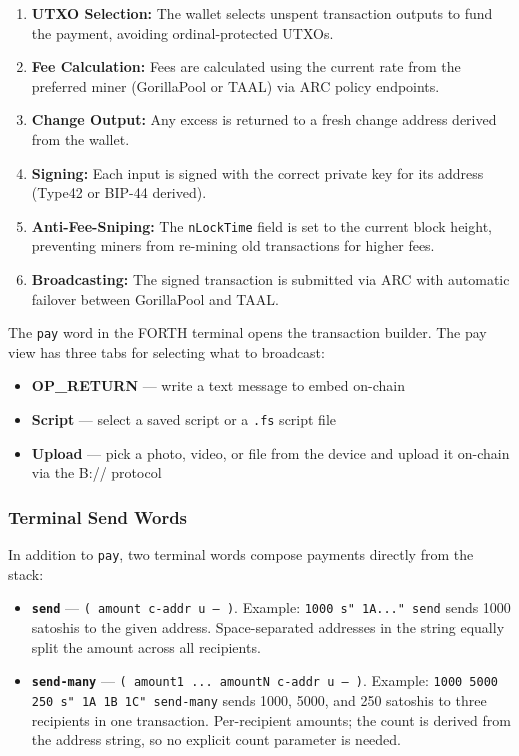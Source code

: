 \documentclass[a4paper, 11pt, openany]{book}
\begin{document}
\begin{enumerate}
\item \textbf{UTXO Selection:} The wallet selects unspent transaction outputs to fund the payment, avoiding ordinal-protected UTXOs.
\item \textbf{Fee Calculation:} Fees are calculated using the current rate from the preferred miner (GorillaPool or TAAL) via ARC policy endpoints.
\item \textbf{Change Output:} Any excess is returned to a fresh change address derived from the wallet.
\item \textbf{Signing:} Each input is signed with the correct private key for its address (Type42 or BIP-44 derived).
\item \textbf{Anti-Fee-Sniping:} The \texttt{nLockTime} field is set to the current block height, preventing miners from re-mining old transactions for higher fees.
\item \textbf{Broadcasting:} The signed transaction is submitted via ARC with automatic failover between GorillaPool and TAAL.
\end{enumerate}

The \texttt{pay} word in the FORTH terminal opens the transaction builder. The pay view has three tabs for selecting what to broadcast:

\begin{itemize}
\item \textbf{OP\_RETURN} --- write a text message to embed on-chain
\item \textbf{Script} --- select a saved script or a \texttt{.fs} script file
\item \textbf{Upload} --- pick a photo, video, or file from the device and upload it on-chain via the B:// protocol
\end{itemize}

\subsubsection*{Terminal Send Words}

In addition to \texttt{pay}, two terminal words compose payments directly from the stack:

\begin{itemize}
\item \textbf{\texttt{send}} --- \texttt{( amount c-addr u -- )}. Example: \texttt{1000 s" 1A..." send} sends 1000 satoshis to the given address. Space-separated addresses in the string equally split the amount across all recipients.
\item \textbf{\texttt{send-many}} --- \texttt{( amount1 ... amountN c-addr u -- )}. Example: \texttt{1000 5000 250 s" 1A 1B 1C" send-many} sends 1000, 5000, and 250 satoshis to three recipients in one transaction. Per-recipient amounts; the count is derived from the address string, so no explicit count parameter is needed.
\end{itemize}
\end{document}
